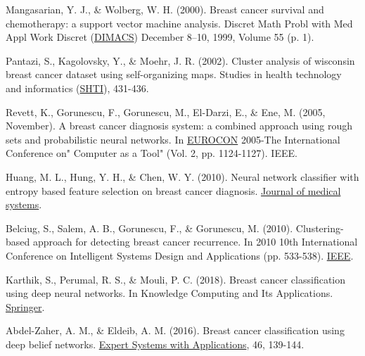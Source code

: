 \documentclass[12pt]{article}
\numberwithin{equation}{section}
\begin{document}
\begin{flushleft}
\begin{thebibliography}{9}
 \label{BG_4}
Mangasarian, Y. J., \& Wolberg, W. H. (2000). Breast cancer survival and chemotherapy: a support vector machine analysis. Discret Math Probl with Med Appl Work Discret (\href{https://books.google.co.il/books?hl=en&lr=&id=jxOHV22bOekC&oi=fnd&pg=PA1&dq=wisconsin+breast+cancer+dataset&ots=A62LYkr-6U&sig=cXIudG3489I61CJk7Vc2nsSFnvc&redir_esc=y#v=onepage&q=wisconsin%20breast%20cancer%20dataset&f=false}{DIMACS}) December 8–10, 1999, Volume 55 (p. 1).


 \label{BG_5}
Pantazi, S., Kagolovsky, Y., \& Moehr, J. R. (2002). Cluster analysis of wisconsin breast cancer dataset using self-organizing maps. Studies in health technology and informatics (\href{https://books.google.co.il/books?hl=en&lr=&id=_H2r7pGUNloC&oi=fnd&pg=PA431&dq=wisconsin+breast+cancer+dataset&ots=8ZNuFZYDmy&sig=odOEVgZ8t2L2qlFqlbBpcaN31UI&redir_esc=y#v=onepage&q=wisconsin%20breast%20cancer%20dataset&f=false}{SHTI}), 431-436.


 \label{BG_6}
Revett, K., Gorunescu, F., Gorunescu, M., El-Darzi, E., \& Ene, M. (2005, November). A breast cancer diagnosis system: a combined approach using rough sets and probabilistic neural networks. In \href{https://ieeexplore.ieee.org/abstract/document/1630149}{EUROCON} 2005-The International Conference on" Computer as a Tool" (Vol. 2, pp. 1124-1127). IEEE.


 \label{BG_7}
Huang, M. L., Hung, Y. H., \& Chen, W. Y. (2010). Neural network classifier with entropy based feature selection on breast cancer diagnosis. \href{https://www.sciencedirect.com/science/article/abs/pii/S001048250600076X}{Journal of medical systems}.


 \label{BG_8}
Belciug, S., Salem, A. B., Gorunescu, F., \& Gorunescu, M. (2010). Clustering-based approach for detecting breast cancer recurrence. In 2010 10th International Conference on Intelligent Systems Design and Applications (pp. 533-538). \href{https://ieeexplore.ieee.org/abstract/document/5687211}{IEEE}.


 \label{BG_9}
Karthik, S., Perumal, R. S., \& Mouli, P. C. (2018). Breast cancer classification using deep neural networks. In Knowledge Computing and Its Applications. \href{https://link.springer.com/chapter/10.1007/978-981-10-6680-1_12}{Springer}.


 \label{BG_10}
Abdel-Zaher, A. M., \& Eldeib, A. M. (2016). Breast cancer classification using deep belief networks. \href{https://www.sciencedirect.com/science/article/abs/pii/S0957417415007101}{Expert Systems with Applications}, 46, 139-144.



\end{thebibliography}
\end{flushleft}
\end{document}
